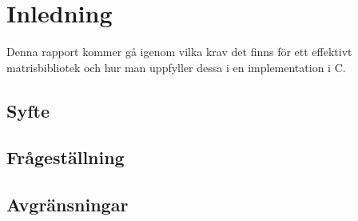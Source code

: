 \section{Inledning}
	Denna rapport kommer gå igenom vilka krav det finns för ett effektivt matrisbibliotek och hur man uppfyller dessa i en implementation i C.
	\subsection{Syfte}
	\subsection{Frågeställning}
	\subsection{Avgränsningar}